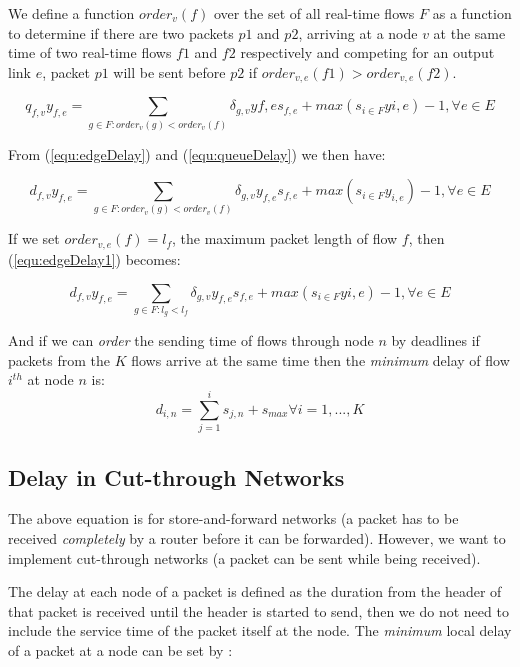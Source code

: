 \documentclass[10pt]{article}
\begin{document}
We define a function $order_v(f)$ over the set of all real-time flows $F$
as a function to determine if there are two packets $p1$ and $p2$, arriving at a
node $v$ at the same time of two real-time flows $f1$ and $f2$ respectively
and competing for an output link $e$, packet $p1$ will be sent before $p2$ if
$order_{v,e}(f1) > order_{v,e}(f2)$.


\begin{equation}\label{equ:queueDelay}
q_{f,v}y_{f,e} = \sum_{g \in F:order_v(g) <
order_v(f)}\delta_{g,v}y{f,e}s_{f,e} + max(s_{i \in F}y{i,e})-1, \forall e \in E
\end{equation}

From (\ref{equ:edgeDelay}) and (\ref{equ:queueDelay}) we then have:

\begin{equation}\label{equ:edgeDelay1}
d_{f,v}y_{f,e} = \sum_{g \in F:order_v(g) <
order_v(f)}\delta_{g,v}y_{f,e}s_{f,e} + max(s_{i \in F}y_{i,e})-1, \forall e \in
E
\end{equation}

If we set $order_{v,e}(f)=l_f$, the maximum packet length of flow $f$, then
(\ref{equ:edgeDelay1}) becomes:

\begin{equation}\label{equ:edgeDelayPacketLength}
d_{f,v}y_{f,e} = \sum_{g \in F:l_g < l_f}\delta_{g,v}y_{f,e}s_{f,e} +
max(s_{i \in F}y{i,e})-1, \forall e \in E
\end{equation}


And if we can {\em order} the sending time
of flows through node $n$ by deadlines if packets from the $K$ flows arrive at
the same time then the {\em minimum} delay of flow $i^{th}$ at node $n$ is:
\begin{equation}
d_{i,n} = \sum_{j=1}^is_{j,n}+s_{max} \forall i = 1, ..., K
\end{equation}

\subsection{Delay in Cut-through Networks}
The above equation is for store-and-forward networks
\cite{DallyPrinNetwork} (a packet has to be received {\em completely} by a
router before it can be forwarded). However, we want to implement cut-through
networks (a packet can be sent while being received).

The delay at each node
of a packet is defined as the duration from the header of that  packet is
received until the header is started to send, then we do not need to include
the service time of the packet itself at the node. The {\em minimum} local
delay of a packet at a node can be set by :
\end{document}
